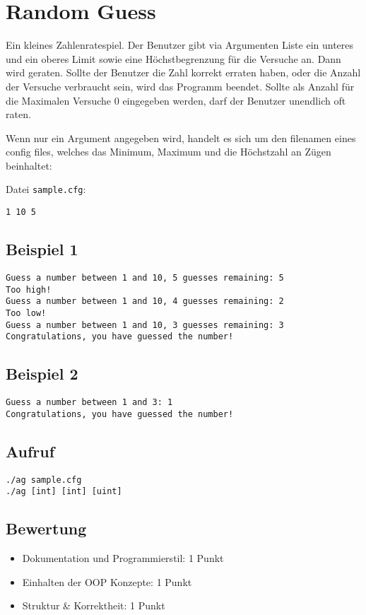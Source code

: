 \documentclass[a4paper,10pt]{article}
\begin{document}
\section*{Random Guess}

Ein kleines Zahlenratespiel. Der Benutzer gibt via Argumenten Liste ein unteres und ein oberes Limit sowie eine Höchstbegrenzung für die Versuche an. Dann wird geraten. Sollte der Benutzer die Zahl korrekt erraten haben, oder die Anzahl der Versuche verbraucht sein, wird das Programm beendet.
Sollte als Anzahl für die Maximalen Versuche 0 eingegeben werden, darf der Benutzer unendlich oft raten.

Wenn nur ein Argument angegeben wird, handelt es sich um den filenamen eines config files,
welches das Minimum, Maximum und die Höchstzahl an Zügen beinhaltet:

Datei \texttt{sample.cfg}:
\begin{lstlisting}[frame=single]
1 10 5
\end{lstlisting}


\subsection*{Beispiel 1}
\begin{verbatim}
Guess a number between 1 and 10, 5 guesses remaining: 5
Too high!
Guess a number between 1 and 10, 4 guesses remaining: 2
Too low!
Guess a number between 1 and 10, 3 guesses remaining: 3
Congratulations, you have guessed the number!
\end{verbatim}


\subsection*{Beispiel 2}
\begin{verbatim}
Guess a number between 1 and 3: 1
Congratulations, you have guessed the number!
\end{verbatim}



\subsection*{Aufruf}
\texttt{./ag sample.cfg}\\
\texttt{./ag [int] [int] [uint]}

\subsection*{Bewertung}
\begin{itemize}
 \item Dokumentation und Programmierstil: 1 Punkt
 \item Einhalten der OOP Konzepte: 1 Punkt
 \item Struktur \& Korrektheit: 1 Punkt
\end{itemize}

\newpage
\end{document}
